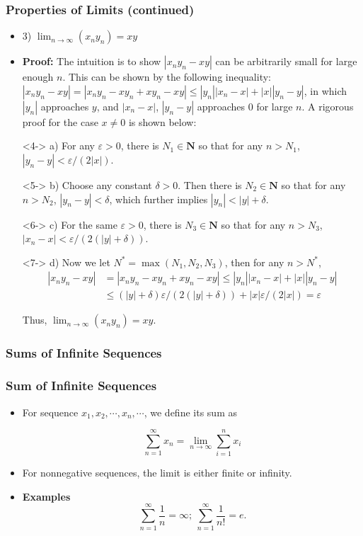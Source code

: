 \documentclass[handout]{beamer}
\begin{document}
\frame
{
  \frametitle{Properties of Limits (continued)}

   \begin{itemize} \item<1-> 3) $\lim_{n\rightarrow\infty} (x_ny_n)=xy$
    
      \item<2-> \textbf{Proof:} The intuition is to show $|x_ny_n-xy|$ can be arbitrarily small for large enough $n$. This can be shown by the following inequality: $|x_ny_n-xy|=|x_ny_n -xy_n+xy_n-xy|\leq |y_n||x_n-x|+|x| |y_n-y|$, in which $|y_n|$ approaches $y$, and $|x_n-x|$, $|y_n-y|$ approaches 0 for large $n$. A rigorous proof for the case $x\neq 0$ is shown below:
      
        \item[]<4-> a)  For any $\varepsilon>0$, there is $N_1\in \mathbf{N}$ so that for any $n>N_1$, $|y_n-y|<\varepsilon/(2|x|)$.
        \item[]<5-> b) Choose any constant $\delta>0$. Then there is $N_2\in \mathbf{N}$ so that for any $n>N_2$, $|y_n-y|<\delta$, which further implies $|y_n|<|y|+\delta$. 
        \item[]<6-> c) For the same $\varepsilon>0$, there is $N_3\in \mathbf{N}$ so that for any $n>N_3$, $|x_n-x|<\varepsilon/(2(|y|+\delta))$.
        \item[]<7-> d) Now we let $N^*=\max(N_1, N_2,N_3)$, then for any $n>N^*$,       
       \begin{align*}|x_ny_n-xy|& =|x_ny_n -xy_n+xy_n-xy|\leq |y_n||x_n-x|+|x| |y_n-y| \\ & \leq (|y|+\delta) \varepsilon/(2(|y|+\delta))+|x| \varepsilon/(2|x|)=\varepsilon\end{align*}

        
        Thus, $\lim_{n\rightarrow\infty} (x_ny_n)=xy$.
        
        
  \end{itemize}
}


\subsubsection{Sums of Infinite Sequences}

\frame
{
  \frametitle{Sum of Infinite Sequences}

   \begin{itemize}
  \item <1-> For sequence $x_1,x_2,\cdots,x_n,\cdots $, we define its sum as 
  
  $$\sum_{n=1}^{\infty} x_n=\lim_{n\rightarrow\infty} \sum_{i=1}^n x_i $$
  
   \item<2-> For nonnegative sequences, the limit is either finite or infinity.    
   \item<3-> \textbf{Examples} $$\sum_{n=1}^{\infty} \frac{1}{n}= \infty;\ \sum_{n=1}^{\infty} \frac{1}{n!}= e.$$
       
  \end{itemize}
}
\end{document}
